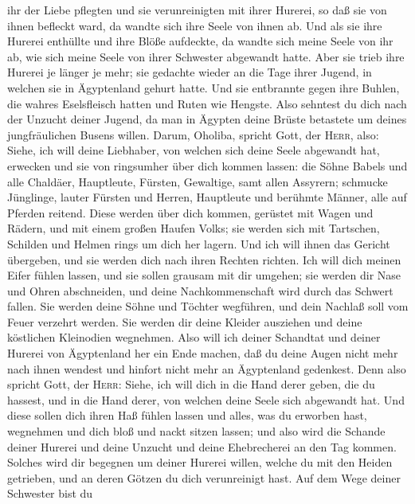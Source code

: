 ihr der Liebe pflegten und sie verunreinigten mit ihrer Hurerei, so daß
sie von ihnen befleckt ward, da wandte sich ihre Seele von ihnen ab.
 Und als sie ihre Hurerei enthüllte und ihre Blöße
aufdeckte, da wandte sich meine Seele von ihr ab, wie sich meine Seele
von ihrer Schwester abgewandt hatte.  Aber sie trieb ihre
Hurerei je länger je mehr; sie gedachte wieder an die Tage ihrer Jugend,
in welchen sie in Ägyptenland gehurt hatte.  Und sie
entbrannte gegen ihre Buhlen, die wahres Eselsfleisch hatten und Ruten
wie Hengste.  Also sehntest du dich nach der Unzucht
deiner Jugend, da man in Ägypten deine Brüste betastete um deines
jungfräulichen Busens willen.  Darum, Oholiba, spricht
Gott, der \textsc{Herr}, also: Siehe, ich will deine Liebhaber, von
welchen sich deine Seele abgewandt hat, erwecken und sie von ringsumher
über dich kommen lassen:  die Söhne Babels und alle
Chaldäer, Hauptleute, Fürsten, Gewaltige, samt allen Assyrern; schmucke
Jünglinge, lauter Fürsten und Herren, Hauptleute und berühmte Männer,
alle auf Pferden reitend.  Diese werden über dich kommen,
gerüstet mit Wagen und Rädern, und mit einem großen Haufen Volks; sie
werden sich mit Tartschen, Schilden und Helmen rings um dich her lagern.
Und ich will ihnen das Gericht übergeben, und sie werden dich nach ihren
Rechten richten.  Ich will dich meinen Eifer fühlen
lassen, und sie sollen grausam mit dir umgehen; sie werden dir Nase und
Ohren abschneiden, und deine Nachkommenschaft wird durch das Schwert
fallen. Sie werden deine Söhne und Töchter wegführen, und dein Nachlaß
soll vom Feuer verzehrt werden.  Sie werden dir deine
Kleider ausziehen und deine köstlichen Kleinodien wegnehmen.
 Also will ich deiner Schandtat und deiner Hurerei von
Ägyptenland her ein Ende machen, daß du deine Augen nicht mehr nach
ihnen wendest und hinfort nicht mehr an Ägyptenland gedenkest.
 Denn also spricht Gott, der \textsc{Herr}: Siehe, ich
will dich in die Hand derer geben, die du hassest, und in die Hand
derer, von welchen deine Seele sich abgewandt hat.  Und
diese sollen dich ihren Haß fühlen lassen und alles, was du erworben
hast, wegnehmen und dich bloß und nackt sitzen lassen; und also wird die
Schande deiner Hurerei und deine Unzucht und deine Ehebrecherei an den
Tag kommen.  Solches wird dir begegnen um deiner Hurerei
willen, welche du mit den Heiden getrieben, und an deren Götzen du dich
verunreinigt hast.  Auf dem Wege deiner Schwester bist du
